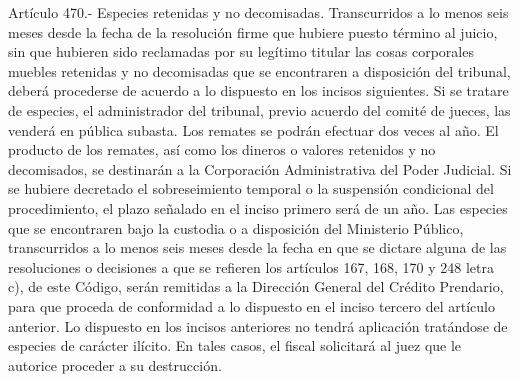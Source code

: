     Artículo 470.- Especies retenidas y no decomisadas. Transcurridos a lo menos seis meses desde la fecha de la resolución firme que hubiere puesto término al juicio, sin que hubieren sido reclamadas por su legítimo titular las cosas corporales muebles retenidas y no decomisadas que se encontraren a disposición del tribunal, deberá procederse de acuerdo a lo dispuesto en los incisos siguientes.
    Si se tratare de especies, el administrador del tribunal, previo acuerdo del comité de jueces, las venderá en pública subasta. Los remates se podrán efectuar dos veces al año.
    El producto de los remates, así como los dineros o valores retenidos y no decomisados, se destinarán a la Corporación Administrativa del Poder Judicial.
    Si se hubiere decretado el sobreseimiento temporal o la suspensión condicional del procedimiento, el plazo señalado en el inciso primero será de un año.
    Las especies que se encontraren bajo la custodia o a disposición del Ministerio Público, transcurridos a lo menos seis meses desde la fecha en que se dictare alguna de las resoluciones o decisiones a que se refieren los artículos 167, 168, 170 y 248 letra c), de este Código, serán remitidas a la Dirección General del Crédito Prendario, para que proceda de conformidad a lo dispuesto en el inciso tercero del artículo anterior.
    Lo dispuesto en los incisos anteriores no tendrá aplicación tratándose de especies de carácter ilícito. En tales casos, el fiscal solicitará al juez que le autorice proceder a su destrucción.

